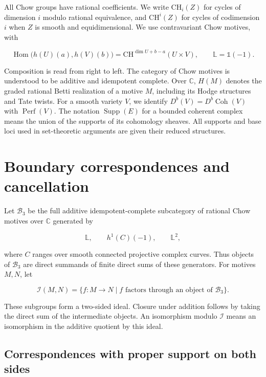 \documentclass[11pt,a4paper]{article}
\begin{document}
All Chow groups have rational coefficients. We write $\mathrm{CH}_i(Z)$ for cycles of dimension $i$ modulo rational equivalence, and $\mathrm{CH}^i(Z)$ for cycles of codimension $i$ when $Z$ is smooth and equidimensional. We use contravariant Chow motives, with

\begin{equation*}
\operatorname{Hom}\bigl(h(U)(a),h(V)(b)\bigr)
=\mathrm{CH}^{\dim U+b-a}(U\times V),
\qquad
\mathbb L=\mathbb 1(-1).
\end{equation*}

Composition is read from right to left. The category of Chow motives is understood to be additive and idempotent complete. Over $\mathbb C$, $H(M)$ denotes the graded rational Betti realization of a motive $M$, including its Hodge structures and Tate twists. For a smooth variety $V$, we identify $D^b(V)=D^b\!\operatorname{Coh}(V)$ with $\operatorname{Perf}(V)$. The notation $\operatorname{Supp}(E)$ for a bounded coherent complex means the union of the supports of its cohomology sheaves. All supports and base loci used in set-theoretic arguments are given their reduced structures.

\section{Boundary correspondences and cancellation}

Let $\mathcal B_3$ be the full additive idempotent-complete subcategory of rational Chow motives over $\mathbb C$ generated by

\begin{equation*}
\mathbb L,\qquad h^1(C)(-1),\qquad \mathbb L^2,
\tag{2.1}
\end{equation*}

where $C$ ranges over smooth connected projective complex curves. Thus objects of $\mathcal B_3$ are direct summands of finite direct sums of these generators. For motives $M,N$, let

\begin{equation*}
\mathcal I(M,N)=
\{f:M\longrightarrow N\mid f\text{ factors through an object of }\mathcal B_3\}.
\tag{2.2}
\end{equation*}

These subgroups form a two-sided ideal. Closure under addition follows by taking the direct sum of the intermediate objects. An isomorphism modulo $\mathcal I$ means an isomorphism in the additive quotient by this ideal.

\subsection{Correspondences with proper support on both sides}
\end{document}
